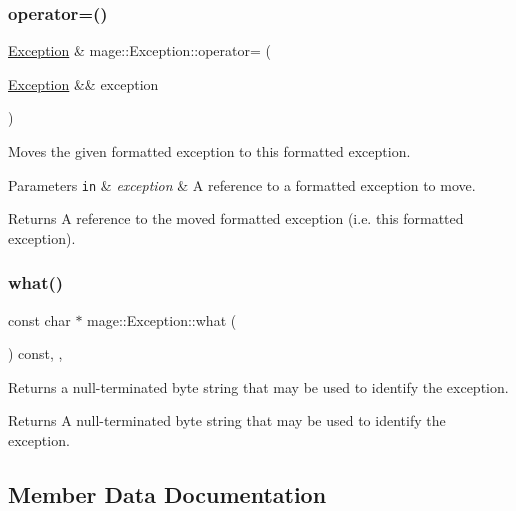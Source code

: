 \subsubsection{\texorpdfstring{operator=()}{operator=()}\hspace{0.1cm}{\footnotesize\ttfamily [2/2]}}
{\footnotesize\ttfamily \hyperlink{classmage_1_1_exception}{Exception} \& mage\+::\+Exception\+::operator= (\begin{DoxyParamCaption}\item[{\hyperlink{classmage_1_1_exception}{Exception} \&\&}]{exception }\end{DoxyParamCaption})\hspace{0.3cm}{\ttfamily [default]}}

Moves the given formatted exception to this formatted exception.


\begin{DoxyParams}[1]{Parameters}
\mbox{\tt in}  & {\em exception} & A reference to a formatted exception to move. \\
\hline
\end{DoxyParams}
\begin{DoxyReturn}{Returns}
A reference to the moved formatted exception (i.\+e. this formatted exception). 
\end{DoxyReturn}
\hypertarget{classmage_1_1_exception_ae2bd4437e2b7c960f022f7d3bf79baa7}{}\label{classmage_1_1_exception_ae2bd4437e2b7c960f022f7d3bf79baa7} 
\subsubsection{\texorpdfstring{what()}{what()}}
{\footnotesize\ttfamily const char $\ast$ mage\+::\+Exception\+::what (\begin{DoxyParamCaption}{ }\end{DoxyParamCaption}) const\hspace{0.3cm}{\ttfamily [override]}, {\ttfamily [virtual]}, {\ttfamily [noexcept]}}

Returns a null-\/terminated byte string that may be used to identify the exception.

\begin{DoxyReturn}{Returns}
A null-\/terminated byte string that may be used to identify the exception. 
\end{DoxyReturn}


\subsection{Member Data Documentation}
\hypertarget{classmage_1_1_exception_ad5bd9bb044bebaa1bac36c8c8a25c052}{}\label{classmage_1_1_exception_ad5bd9bb044bebaa1bac36c8c8a25c052} 
